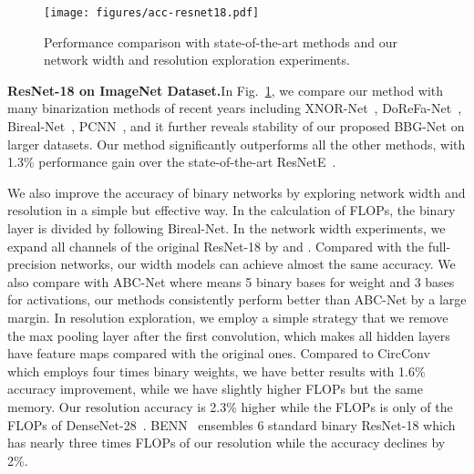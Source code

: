 \documentclass{article}
\begin{document}
\begin{figure}
	\centering
	\texttt{[image: figures/acc-resnet18.pdf]}
	\vspace{-0.3in}
	\caption{Performance comparison with state-of-the-art methods and our network width and resolution exploration experiments.}
	\label{vis}
	\vspace{-0.2in}
\end{figure}

\textbf{ResNet-18 on ImageNet Dataset.}In Fig.~\ref{vis}, we compare our method with many binarization methods of recent years including XNOR-Net~\cite{rastegari2016xnor}, DoReFa-Net~\cite{zhou2016dorefa}, Bireal-Net~\cite{bi-real}, PCNN~\cite{gu2019projection}, and it further reveals stability of our proposed BBG-Net on larger datasets. Our method significantly outperforms all the other methods, with 1.3\% performance gain over the state-of-the-art ResNetE~\cite{bethge2019back}. 

We also improve the accuracy of binary networks by exploring network width and resolution in a simple but effective way. In the calculation of FLOPs, the binary layer is divided by  following Bireal-Net\cite{bi-real}. In the network width experiments, we expand all channels of the original ResNet-18 by  and . Compared with the full-precision networks, our  width models can achieve almost the same accuracy. We also compare with ABC-Net where  means 5 binary bases for weight and 3 bases for activations, our methods consistently perform better than ABC-Net by a large margin. In resolution exploration, we employ a simple strategy that we remove the max pooling layer after the first convolution, which makes all hidden layers have  feature maps compared with the original ones. Compared to CircConv~\cite{liu2019circulant} which employs four times binary weights, we have better results with 1.6\% accuracy improvement, while we have slightly higher FLOPs but the same memory. Our resolution accuracy is 2.3\% higher while the FLOPs is only  of the FLOPs of DenseNet-28~\cite{bethge2019back}. BENN~\cite{zhu2019binary} ensembles 6 standard binary ResNet-18 which has nearly three times FLOPs of our resolution while the accuracy declines by 2\%.	
\end{document}
